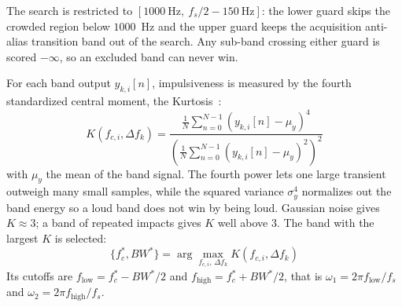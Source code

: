 The search is restricted to $[1000~\text{Hz},\ f_s/2-150~\text{Hz}]$: the lower
guard skips the crowded region below $1000$~Hz and the upper guard keeps the
acquisition anti-alias transition band out of the search. Any sub-band crossing
either guard is scored $-\infty$, so an excluded band can never win.

For each band output $y_{k,i}[n]$, impulsiveness is measured by the fourth
standardized central moment, the Kurtosis~\cite{antoni2006}:
\begin{equation}
  K(f_{c,i}, \Delta f_k) = \frac{\frac{1}{N}\sum_{n=0}^{N-1}
  \left(y_{k,i}[n] - \mu_{y}\right)^4}{\left(\frac{1}{N}\sum_{n=0}^{N-1}
  \left(y_{k,i}[n] - \mu_{y}\right)^2\right)^2}
\end{equation}
with $\mu_y$ the mean of the band signal. The fourth power lets one large
transient outweigh many small samples, while the squared variance $\sigma_y^4$
normalizes out the band energy so a loud band does not win by being loud.
Gaussian noise gives $K \approx 3$; a band of repeated impacts gives $K$ well
above $3$. The band with the largest $K$ is selected:
\begin{equation}
  \{f_c^*, BW^*\} = \arg\max_{f_{c,i}, \, \Delta f_k} K(f_{c,i}, \Delta f_k)
\end{equation}
Its cutoffs are $f_{\text{low}} = f_c^* - BW^*/2$ and
$f_{\text{high}} = f_c^* + BW^*/2$, that is
$\omega_1 = 2\pi f_{\text{low}}/f_s$ and $\omega_2 = 2\pi f_{\text{high}}/f_s$.

